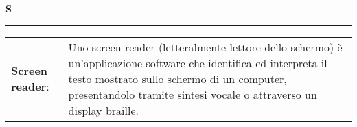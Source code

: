 	\hfill\Huge{\textbf{S}}\\
\rule{16cm}{.6pt}
\normalsize
	\begin{longtable}{p{} p{}} 
	    \\
		    \textbf{Screen reader}: & Uno screen reader (letteralmente lettore dello schermo) è un'applicazione software che identifica ed interpreta il testo mostrato sullo schermo di un computer, presentandolo tramite sintesi vocale o attraverso un display braille.\\
	\end{longtable}
	
	
	
	
	
	
	
	
	
	
	
	
	
	
	

